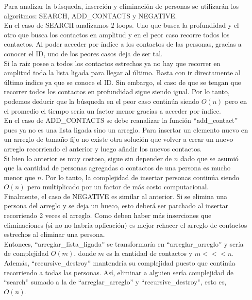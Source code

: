\documentclass[letter]{article}
\begin{document}
	
	\begin{parte}{2}
		
	Para analizar la búsqueda, inserción y eliminación de personas se utilizarán los algoritmos: SEARCH, ADD\_CONTACTS y NEGATIVE.\\
	
	En el caso de SEARCH analizamos 2 loops. Uno que busca la profundidad y el otro que busca los contactos en amplitud y en el peor caso recorre todos los contactos. Al poder acceder por índice a los contactos de las personas, gracias a conocer el ID, uno de los peores casos deja de ser tal.\\
	
	Si la raíz posee a todos los contactos estrechos ya no hay que recorrer en amplitud toda la lista ligada para llegar al último. Basta con ir directamente al último índice ya que se conoce el ID. Sin embargo, el caso de que se tengan que recorrer todos los contactos en profundidad sigue siendo igual. Por lo tanto, podemos deducir que la búsqueda en el peor caso continúa siendo $O(n)$ pero en el promedio el tiempo sería un factor menor gracias a acceder por índice.\\
	
	En el caso de ADD\_CONTACTS se debe reanalizar la función ``add\_contact'' pues ya no es una lista ligada sino un arreglo. Para insertar un elemento nuevo en un arreglo de tamaño fijo no existe otra solución que volver a crear un nuevo arreglo recorriendo el anterior y luego añadir los nuevos contactos.\\
	
	Si bien lo anterior es muy costoso, sigue sin depender de $n$ dado que se asumió que la cantidad de personas agregadas o contactos de una persona es mucho menor que $n$. Por lo tanto, la complejidad de insertar personas continúa siendo $O(n)$ pero multiplicado por un factor de más costo computacional.\\
	
	Finalmente, el caso de NEGATIVE es similar al anterior. Si se elimina una persona del arreglo y se deja un hueco, esto deberá ser parchado al insertar recorriendo 2 veces el arreglo. Como deben haber más inserciones que eliminaciones (si no no habría aplicación) es mejor rehacer el arreglo de contactos estrechos al eliminar una persona.\\
	
	Entonces, ``arreglar\_lista\_ligada'' se transformaría en ``arreglar\_arreglo'' y sería de complejidad $O(m)$, donde $m$ es la cantidad de contactos y $m <<< n$. Además, ``recursive\_destroy'' mantendría su complejidad puesto que continúa recorriendo a todas las personas. Así, eliminar a alguien sería complejidad de ``search'' sumado a la de ``arreglar\_arreglo'' y ``recursive\_destroy'', esto es, $O(n)$.\\
	

\end{parte}
\end{document}
